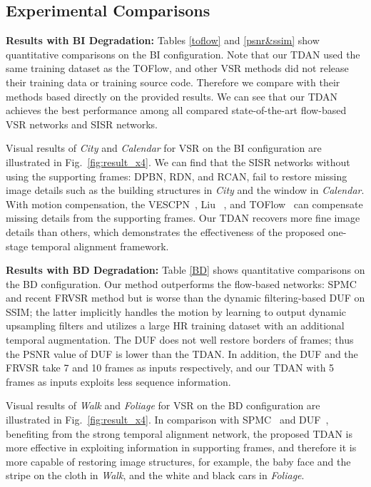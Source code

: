 \documentclass[10pt,twocolumn,letterpaper]{article}
\begin{document}
\subsection{Experimental Comparisons}
\label{exp_comp}

\noindent \textbf{Results with BI Degradation:}
Tables \ref{toflow} and \ref{psnr&ssim} show quantitative comparisons on the BI configuration. Note that our TDAN used the same training dataset as the TOFlow, and other VSR methods did not release their training data or training source code. Therefore we compare with their methods based directly on the provided results. We can see that our TDAN achieves the best performance among all compared state-of-the-art flow-based VSR networks and SISR networks.

Visual results of \textit{City} and \textit{Calendar} for  VSR on the BI configuration are illustrated in Fig.~\ref{fig:result_x4}.  We can find that the SISR networks without using the supporting frames: DPBN, RDN, and RCAN, fail to restore missing image details such as the building structures in \textit{City} and the window in \textit{Calendar}. With motion compensation, the VESCPN~\cite{caballero2017real}, Liu \etal~\cite{liu2017robust}, and TOFlow~\cite{xue2017video} can compensate missing details from the supporting frames. Our TDAN recovers more fine image details than others, which demonstrates the effectiveness of the proposed one-stage temporal alignment framework.

\noindent \textbf{Results with BD Degradation:}
Table \ref{BD} shows quantitative comparisons on the BD configuration. Our method outperforms the flow-based networks: SPMC and recent FRVSR method but is worse than the dynamic filtering-based DUF on SSIM; the latter implicitly handles the motion by learning to output dynamic upsampling filters and utilizes a large HR training dataset with an additional temporal augmentation. The DUF does not well restore borders of frames; thus the PSNR value of DUF is lower than the TDAN. In addition, the DUF and the FRVSR take 7 and 10 frames as inputs respectively, and our TDAN with 5 frames as inputs exploits less sequence information.

Visual results of \textit{Walk} and \textit{Foliage} for  VSR on the BD configuration are illustrated in Fig.~\ref{fig:result_x4}. In comparison with SPMC~\cite{tao2017detail} and DUF~\cite{jo2018deep}, benefiting from the strong temporal alignment network, the proposed TDAN is more effective in exploiting information in supporting frames, and therefore it is more capable of restoring image structures, for example, the baby face and the stripe on the cloth in \textit{Walk}, and the white and black cars in \textit{Foliage}.
\end{document}
